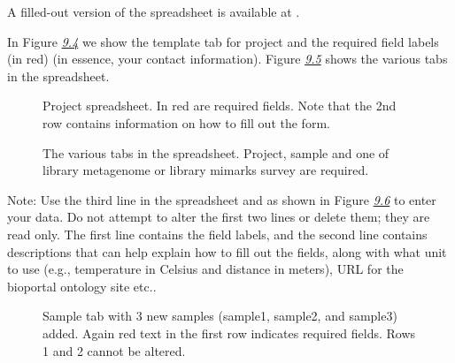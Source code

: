 \documentclass[letterpaper,10pt,english]{sphinxmanual}
\begin{document}
A filled-out version of the spreadsheet is available at
.

In Figure {\hyperref[\detokenize{user_manual:fig:project-spreadsheet}]{\emph{9.4}}} we show the template tab
for project and the required field labels (in red) (in essence, your
contact information). Figure
{\hyperref[\detokenize{user_manual:fig:project-spreadsheet-multiple-tabs}]{\emph{9.5}}} shows the various tabs
in the spreadsheet.

\begin{figure}[htbp]
\centering
\capstart

\noindent{}
\caption{Project spreadsheet. In red are required fields. Note that the 2nd
row contains information on how to fill out the form.}\label{\detokenize{user_manual:fig-project-spreadsheet}}\end{figure}

\begin{figure}[htbp]
\centering
\capstart

\noindent{}
\caption{The various tabs in the spreadsheet. Project, sample and one of
library metagenome or library mimarks survey are required.}\label{\detokenize{user_manual:fig-project-spreadsheet-multiple-tabs}}\end{figure}

Note: Use the third line in the spreadsheet and as shown in Figure
{\hyperref[\detokenize{user_manual:fig:project-spreadsheet-with-3-samples}]{\emph{9.6}}} to enter your data. Do
not attempt to alter the first two lines or delete them; they are read
only. The first line contains the field labels, and the second line
contains descriptions that can help explain how to fill out the fields,
along with what unit to use (e.g., temperature in Celsius and distance
in meters), URL for the bioportal ontology site etc..

\begin{figure}[htbp]
\centering
\capstart

\noindent{}
\caption{Sample tab with 3 new samples (sample1, sample2, and sample3) added.
Again red text in the first row indicates required fields. Rows 1 and
2 cannot be altered.}\label{\detokenize{user_manual:fig-project-spreadsheet-with-3-samples}}\end{figure}
\end{document}
